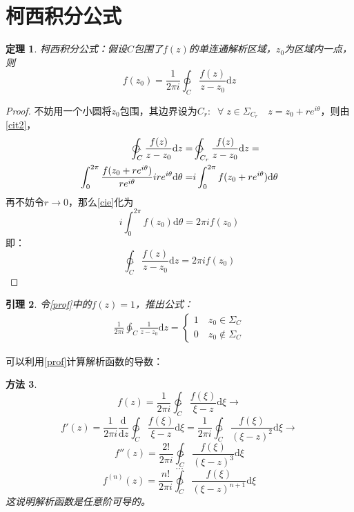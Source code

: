 \documentclass[10pt, a4paper, oneside]{ctexbook}
\newtheorem{theorem}{定理}[section]
\newtheorem{lemma}[theorem]{引理}
\newtheorem{method}[theorem]{方法}
\def\D{\mathrm{d}}
\newcommand{\F}[1][z]
{\ensuremath{f(#1)}}
\newcommand{\dev}[3][]
{\ensuremath{\frac{\displaystyle \D^{#1} #2}{ \displaystyle \D #3}}}
\begin{document}
\section{柯西积分公式}
\begin{theorem}
    柯西积分公式：假设$C$包围了$\F$的单连通解析区域，$z_0$为区域内一点，则
    $$\F[z_0]=\frac{1}{2\pi i}\ointctrclockwise_C \frac{\F}{z-z_0}\D z$$
\end{theorem}
\begin{proof}
    不妨用一个小圆将$z_0$包围，其边界设为$\displaystyle C_r: \;\;\forall \; z\in \Sigma_{C_r}\quad z=z_0+re^{i\theta}$，则由\ref{cit2}，
    \begin{align}
        \ointctrclockwise_C \frac{\F}{z-z_0}\D z=&\ointctrclockwise_{C_r}\frac{\F}{z-z_0}\D z= \notag\\
        \int_0^{2\pi}\frac{\F[z_0+re^{i\theta}]}{re^{i\theta}}ire^{i\theta}\D \theta=&
        i\int_{0}^{2\pi}\F[z_0+re^{i\theta}]\D \theta\label{cie}
    \end{align}
    再不妨令$r\to0$，那么\ref{cie}化为
    $$i\int_{0}^{2\pi}\F[z_0]\D \theta=2\pi i \F[z_0]$$
    即：
    \begin{equation}
    \label{prof}
    \ointctrclockwise_C \frac{\F}{z-z_0}\D z=2\pi i \F[z_0]
    \end{equation}
\end{proof}
\begin{lemma}
    令\ref{prof}中的$\F=1$，推出公式：
    \begin{align*}
        \frac{1}{2\pi i}\ointctrclockwise_C \frac{1}{z-z_0} \D z=
        \begin{cases}
            1\quad z_0\in \Sigma_C\\
            0\quad z_0\notin \Sigma_C
        \end{cases}
    \end{align*}
\end{lemma}
可以利用\ref{prof}计算解析函数的导数：
\begin{method}
    \label{method283}
    $$
    \F = \frac{1}{2\pi i}\ointctrclockwise_C \frac{\F[\xi]}{\xi-z}\D \xi \to
    $$
    $$
    f'(z)=\frac{1}{2\pi i} \dev{}{z}\ointctrclockwise_C \frac{\F[\xi]}{\xi - z}\D \xi= \frac{1}{2\pi i}\ointctrclockwise_C \frac{\F[\xi]}{(\xi-z)^2}\D \xi \to
    $$
    $$
    f''(z)=\frac{2!}{2\pi i}\ointctrclockwise_C \frac{\F[\xi]}{(\xi-z)^3}\D \xi 
    $$
    $$\dots$$
    $$
    f^{(n)}(z)=\frac{n!}{2\pi i}\ointctrclockwise_C \frac{\F[\xi]}{(\xi-z)^{n+1}}\D \xi
    $$
    这说明解析函数是任意阶可导的。
\end{method}
\end{document}
